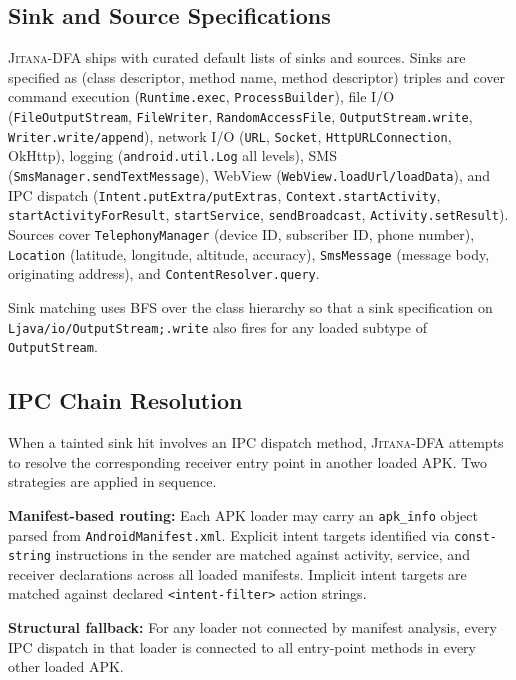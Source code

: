 \documentclass[conference]{IEEEtran}
\begin{document}
\subsection{Sink and Source Specifications}

\textsc{Jitana-DFA} ships with curated default lists of sinks and sources. Sinks
are specified as (class descriptor, method name, method descriptor) triples and
cover command execution (\texttt{Runtime.exec}, \texttt{ProcessBuilder}), file
I/O (\texttt{FileOutputStream}, \texttt{FileWriter}, \texttt{RandomAccessFile},
\texttt{OutputStream.write}, \texttt{Writer.write/append}), network I/O
(\texttt{URL}, \texttt{Socket}, \texttt{HttpURLConnection}, OkHttp), logging
(\texttt{android.util.Log} all levels), SMS (\texttt{SmsManager.sendTextMessage}),
WebView (\texttt{WebView.loadUrl/loadData}), and IPC dispatch
(\texttt{Intent.putExtra/putExtras}, \texttt{Context.startActivity},
\texttt{startActivityForResult}, \texttt{startService}, \texttt{sendBroadcast},
\texttt{Activity.setResult}). Sources cover \texttt{TelephonyManager} (device
ID, subscriber ID, phone number), \texttt{Location} (latitude, longitude,
altitude, accuracy), \texttt{SmsMessage} (message body, originating address),
and \texttt{ContentResolver.query}.

Sink matching uses BFS over the class hierarchy so that a sink specification on
\texttt{Ljava/io/OutputStream;.write} also fires for any loaded subtype of
\texttt{OutputStream}.

\subsection{IPC Chain Resolution}

When a tainted sink hit involves an IPC dispatch method, \textsc{Jitana-DFA}
attempts to resolve the corresponding receiver entry point in another loaded APK.
Two strategies are applied in sequence.

\textbf{Manifest-based routing:} Each APK loader may carry an \texttt{apk\_info}
object parsed from \texttt{AndroidManifest.xml}. Explicit intent targets
identified via \texttt{const-string} instructions in the sender are matched
against activity, service, and receiver declarations across all loaded manifests.
Implicit intent targets are matched against declared \texttt{<intent-filter>}
action strings.

\textbf{Structural fallback:} For any loader not connected by manifest analysis,
every IPC dispatch in that loader is connected to all entry-point methods in
every other loaded APK.
\end{document}
